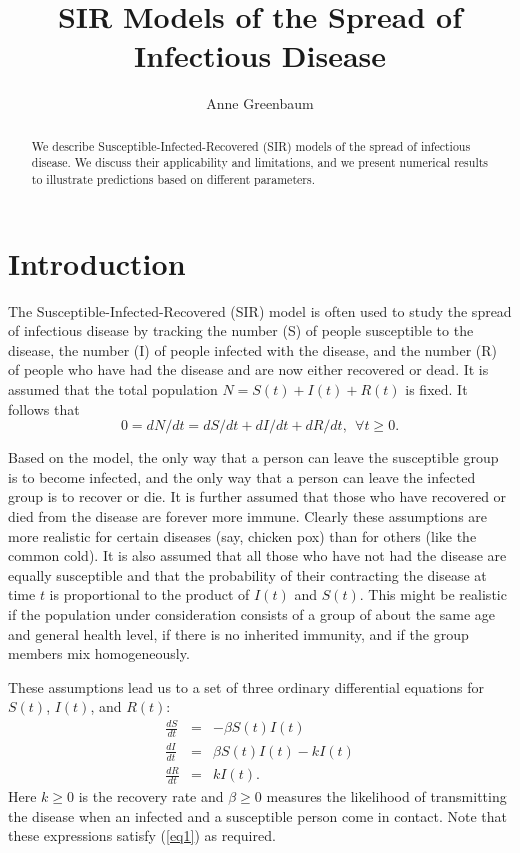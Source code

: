 \documentclass[11pt]{article}
\begin{document}
\title{SIR Models of the Spread of Infectious Disease}
\author{ Anne Greenbaum}
\maketitle

\begin{abstract}
We describe Susceptible-Infected-Recovered (SIR) models of the spread of 
infectious disease.  We discuss their applicability and limitations, and 
we present numerical results to illustrate predictions based on different 
parameters.
\end{abstract}

\section{Introduction}
The Susceptible-Infected-Recovered (SIR) model \cite{Wikipedia} is often used 
to study the spread of infectious disease by tracking the number (S) of people 
susceptible to the disease, the number (I) of people infected with the disease, 
and the number (R) of people who have had the disease and are now either 
recovered or dead.  It is assumed that the total population $N = S(t) + I(t) + R(t)$
is fixed.  It follows that 
\begin{equation}
0 = dN/dt = dS/dt + dI/dt + dR/dt ,~~\forall t \geq 0 . \label{eq1}
\end{equation}

Based on the model, the only way that a person can leave the susceptible
group is to become infected, and the only way that a person can leave the
infected group is to recover or die.  It is further assumed that those
who have recovered or died from the disease are forever more immune.
Clearly these assumptions are more realistic for certain diseases (say,
chicken pox) than for others (like the common cold).  It is also assumed 
that all those who have not had the disease are equally susceptible
and that the probability of their contracting the disease at time $t$
is proportional to the product of $I(t)$ and $S(t)$.  This might be realistic
if the population under consideration consists of a group of about the
same age and general health level, if there is no inherited immunity,
and if the group members mix homogeneously.

These assumptions lead us to a set of three ordinary differential equations
for $S(t)$, $I(t)$, and $R(t)$:
\begin{eqnarray}
\frac{dS}{dt} & = & - \beta S(t) I(t) \label{eq2a} \\
\frac{dI}{dt} & = & \beta S(t) I(t) - k I(t) \label{eq2b} \\
\frac{dR}{dt} & = & k I(t) . \label{eq2c}
\end{eqnarray}
Here $k \geq 0$ is the recovery rate and $\beta \geq 0$ measures the likelihood
of transmitting the disease when an infected and a susceptible person come
in contact.   Note that these expressions satisfy (\ref{eq1}) as required.
\end{document}
